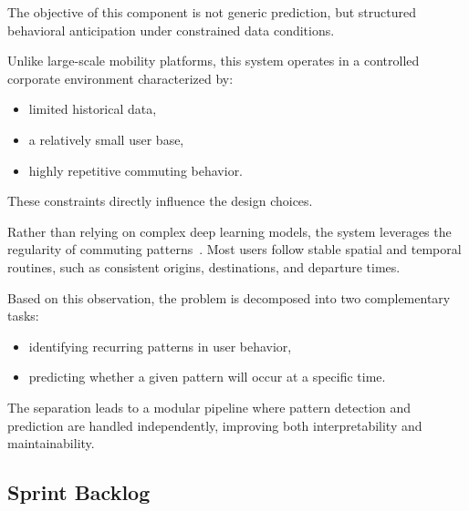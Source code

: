 The objective of this component is not generic prediction, but structured behavioral anticipation under constrained data conditions.

Unlike large-scale mobility platforms, this system operates in a controlled corporate environment characterized by:

\begin{itemize}
    \item limited historical data,
    \item a relatively small user base,
    \item highly repetitive commuting behavior.
\end{itemize}

These constraints directly influence the design choices.

Rather than relying on complex deep learning models, the system leverages the regularity of commuting patterns~\cite{liao2007learning}. Most users follow stable spatial and temporal routines, such as consistent origins, destinations, and departure times.

Based on this observation, the problem is decomposed into two complementary tasks:

\begin{itemize}
    \item identifying recurring patterns in user behavior,
    \item predicting whether a given pattern will occur at a specific time.
\end{itemize}

The separation leads to a modular pipeline where pattern detection and prediction are handled independently, improving both interpretability and maintainability.

\subsection{Sprint Backlog}

